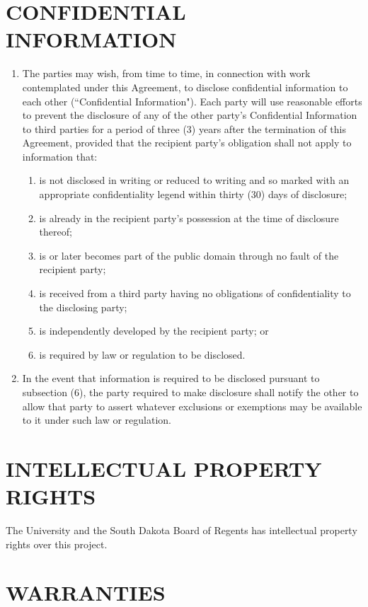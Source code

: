 \documentclass[11pt]{article}
\begin{document}
\section{CONFIDENTIAL INFORMATION }    
\begin{enumerate}  \itemsep4pt \parskip0pt 
\item The parties may wish, from time to time, in connection with work contemplated under this Agreement, to disclose confidential information to each other (``Confidential Information"). Each party will use reasonable efforts to prevent the disclosure of any of the other party's Confidential Information to third parties for a period of three (3) years after the termination of this Agreement, provided that the recipient party's obligation shall not apply to information that:   
\begin{enumerate}  \itemsep4pt \parskip0pt 
\item  is not disclosed in writing or reduced to writing and so     marked with an appropriate confidentiality legend within thirty (30) days of disclosure;  
\item is already in the recipient party's possession at the time of disclosure thereof;  
\item  is or later becomes part of the public domain through no     fault of the recipient party;  
\item  is received from a third party having no obligations of     confidentiality to the disclosing party;  
\item is independently developed by the recipient party; or  
\item is required by law or regulation to be disclosed.     
\end{enumerate}
\item In the event that information is required to be disclosed pursuant to subsection (6), the party required to make disclosure shall notify the other to allow that party to assert whatever exclusions or exemptions may be available to it under such law or regulation.  
\end{enumerate}


\section{INTELLECTUAL PROPERTY RIGHTS } 

The University and the South Dakota Board of Regents has intellectual property rights over this project. 

\section{WARRANTIES }  
\end{document}
